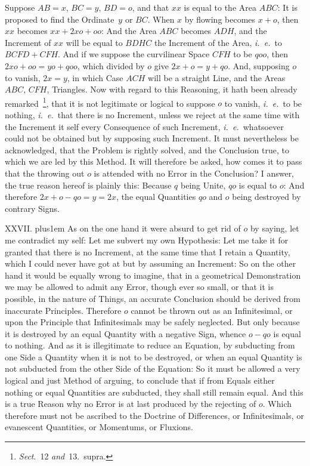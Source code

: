 \midinsert
\centerline{}
\endinsert

\noindent
Suppose $AB = x$, $BC = y$, $BD = o$, and that $xx$ is
equal to the Area $ABC$: It is proposed to find the Ordinate~$y$
or $BC$.  When $x$ by flowing becomes $x + o$, then $xx$ becomes
$xx + 2xo + oo$: And the Area $ABC$ becomes $ADH$, and the
Increment of $xx$ will be equal to $BDHC$ the Increment of the
Area, {\it i.~e.}\ to $BCFD + CFH$.  And if we suppose the
curvilinear Space $CFH$ to be $qoo$, then $2xo + oo = yo + qoo$,
which divided by $o$ give $2x + o = y + qo$.  And, supposing $o$
to vanish, $2x = y$, in which Case $ACH$ will be a straight Line,
and the Areas $ABC$, $CFH$, Triangles.  Now with regard to this
Reasoning, it hath been already
remarked~\footnote*{{\it Sect}.~12 {\it and\/}~13.\ supra.},
that it is not legitimate or logical to suppose $o$ to vanish,
{\it i.~e.}\ to be nothing, {\it i.~e.}\ that there is no
Increment, unless we reject at the same time with the Increment
it self every Consequence of such Increment,
{\it i.~e.}\ whatsoever could not be obtained but by supposing
such Increment.  It must nevertheless be acknowledged, that the
Problem is rightly solved, and the Conclusion true, to which we
are led by this Method.  It will therefore be asked, how comes it
to pass that the throwing out $o$ is attended with no Error in
the Conclusion?  I answer, the true reason hereof is plainly
this: Because $q$ being Unite, $qo$ is equal to $o$: And
therefore $2x + o - qo = y = 2x$, the equal Quantities $qo$ and
$o$ being destroyed by contrary Signs.

\medbreak

XXVII. \hskip 0pt plus1em
As on the one hand it were absurd to get rid of $o$ by saying,
let me contradict my self: Let me subvert my own Hypothesis: Let
me take it for granted that there is no Increment, at the same
time that I retain a Quantity, which I could never have got at
but by assuming an Increment: So on the other hand it would be
equally wrong to imagine, that in a geometrical Demonstration we
may be allowed to admit any Error, though ever so small, or that
it is possible, in the nature of Things, an accurate Conclusion
should be derived from inaccurate Principles.  Therefore $o$
cannot be thrown out as an Infinitesimal, or upon the Principle
that Infinitesimals may be safely neglected.  But only because it
is destroyed by an equal Quantity with a negative Sign, whence
$o - qo$ is equal to nothing.  And as it is illegitimate to
reduce an Equation, by subducting from one Side a Quantity when
it is not to be destroyed, or when an equal Quantity is not
subducted from the other Side of the Equation: So it must be
allowed a very logical and just Method of arguing, to conclude
that if from Equals either nothing or equal Quantities are
subducted, they shall still remain equal.  And this is a true
Reason why no Error is at last produced by the rejecting of $o$.
Which therefore must not be ascribed to the Doctrine of
Differences, or Infinitesimals, or evanescent Quantities, or
Momentums, or Fluxions.

